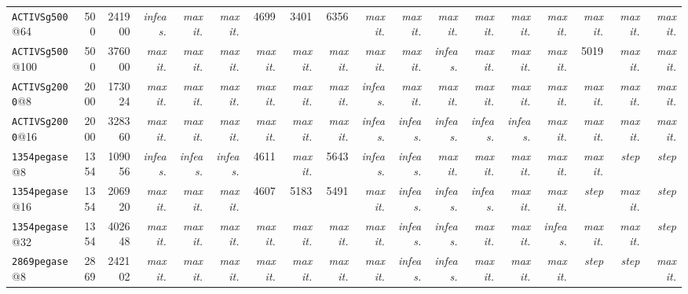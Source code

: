 {\begin{longtable}{lrrrrrrrrrrrrrrrrr}
\texttt{ACTIVSg500}@64 & 500 & 241900 & \textit{infeas.} & \textit{max it.} & \textit{max it.} & 4699 & 3401 & 6356 & \textit{max it.} & \textit{max it.} & \textit{max it.} & \textit{max it.} & \textit{max it.} & \textit{max it.} & \textit{max it.} & \textit{max it.} & \textit{max it.} \\
\texttt{ACTIVSg500}@100 & 500 & 376000 & \textit{max it.} & \textit{max it.} & \textit{max it.} & \textit{max it.} & \textit{max it.} & \textit{max it.} & \textit{max it.} & \textit{max it.} & \textit{infeas.} & \textit{max it.} & \textit{max it.} & \textit{max it.} & 5019 & \textit{max it.} & \textit{max it.} \\
\texttt{ACTIVSg2000}@8 & 2000 & 173024 & \textit{max it.} & \textit{max it.} & \textit{max it.} & \textit{max it.} & \textit{max it.} & \textit{max it.} & \textit{infeas.} & \textit{max it.} & \textit{max it.} & \textit{max it.} & \textit{max it.} & \textit{max it.} & \textit{max it.} & \textit{max it.} & \textit{max it.} \\
\texttt{ACTIVSg2000}@16 & 2000 & 328360 & \textit{max it.} & \textit{max it.} & \textit{max it.} & \textit{max it.} & \textit{max it.} & \textit{max it.} & \textit{infeas.} & \textit{infeas.} & \textit{infeas.} & \textit{infeas.} & \textit{infeas.} & \textit{max it.} & \textit{max it.} & \textit{max it.} & \textit{max it.} \\
\texttt{1354pegase}@8 & 1354 & 109056 & \textit{infeas.} & \textit{infeas.} & \textit{infeas.} & 4611 & \textit{max it.} & 5643 & \textit{infeas.} & \textit{infeas.} & \textit{max it.} & \textit{max it.} & \textit{max it.} & \textit{max it.} & \textit{max it.} & \textit{step} & \textit{step} \\
\texttt{1354pegase}@16 & 1354 & 206920 & \textit{max it.} & \textit{max it.} & \textit{max it.} & 4607 & 5183 & 5491 & \textit{max it.} & \textit{infeas.} & \textit{infeas.} & \textit{infeas.} & \textit{max it.} & \textit{max it.} & \textit{step} & \textit{max it.} & \textit{step} \\
\texttt{1354pegase}@32 & 1354 & 402648 & \textit{max it.} & \textit{max it.} & \textit{max it.} & \textit{max it.} & \textit{max it.} & \textit{max it.} & \textit{max it.} & \textit{infeas.} & \textit{infeas.} & \textit{max it.} & \textit{max it.} & \textit{infeas.} & \textit{max it.} & \textit{max it.} & \textit{step} \\
\texttt{2869pegase}@8 & 2869 & 242102 & \textit{max it.} & \textit{max it.} & \textit{max it.} & \textit{max it.} & \textit{max it.} & \textit{max it.} & \textit{max it.} & \textit{infeas.} & \textit{infeas.} & \textit{max it.} & \textit{max it.} & \textit{max it.} & \textit{step} & \textit{step} & \textit{max it.} \\

\end{longtable}}
